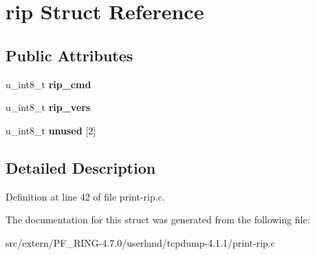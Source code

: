 \hypertarget{structrip}{
\section{rip Struct Reference}
\label{structrip}
}
\subsection*{Public Attributes}
\begin{DoxyCompactItemize}
\item 
\hypertarget{structrip_a9bcbe1fcd514bbac49d44a566dc1a896}{
u\_\-int8\_\-t {\bfseries rip\_\-cmd}}
\label{structrip_a9bcbe1fcd514bbac49d44a566dc1a896}

\item 
\hypertarget{structrip_adca64ef4e9a299c0933902c3b608787a}{
u\_\-int8\_\-t {\bfseries rip\_\-vers}}
\label{structrip_adca64ef4e9a299c0933902c3b608787a}

\item 
\hypertarget{structrip_a8b3e5abef53fee4c26beba1e6ce3d54a}{
u\_\-int8\_\-t {\bfseries unused} \mbox{[}2\mbox{]}}
\label{structrip_a8b3e5abef53fee4c26beba1e6ce3d54a}

\end{DoxyCompactItemize}


\subsection{Detailed Description}


Definition at line 42 of file print-\/rip.c.



The documentation for this struct was generated from the following file:\begin{DoxyCompactItemize}
\item 
src/extern/PF\_\-RING-\/4.7.0/userland/tcpdump-\/4.1.1/print-\/rip.c\end{DoxyCompactItemize}
